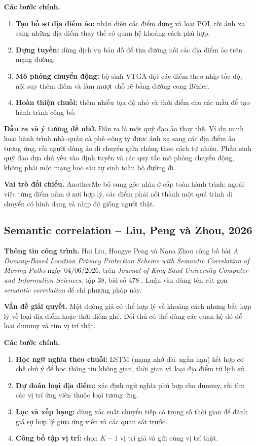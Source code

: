 \documentclass[12pt,a4paper,oneside]{report}
\begin{document}
\noindent\textbf{Các bước chính.}
\begin{enumerate}
  \item \textbf{Tạo hồ sơ địa điểm ảo:} nhận diện các điểm dừng và loại POI, rồi ánh xạ sang những địa điểm thay thế có quan hệ khoảng cách phù hợp.
  \item \textbf{Dựng tuyến:} dùng dịch vụ bản đồ để tìm đường nối các địa điểm ảo trên mạng đường.
  \item \textbf{Mô phỏng chuyển động:} bộ sinh VTGA đặt các điểm theo nhịp tốc độ, nội suy thêm điểm và làm mượt chỗ rẽ bằng đường cong Bézier.
  \item \textbf{Hoàn thiện chuỗi:} thêm nhiễu tọa độ nhỏ và thời điểm cho các mẫu để tạo hành trình công bố.
\end{enumerate}

\noindent\textbf{Đầu ra và ý tưởng dễ nhớ.}
Đầu ra là một quỹ đạo ảo thay thế. Ví dụ minh hoạ: hành trình nhà--quán cà phê--công ty được ánh xạ sang các địa điểm ảo tương ứng, rồi người dùng ảo di chuyển giữa chúng theo cách tự nhiên. Phần sinh quỹ đạo dựa chủ yếu vào định tuyến và các quy tắc mô phỏng chuyển động, không phải một mạng học sâu tự sinh toàn bộ đường đi.

\noindent\textbf{Vai trò đối chiếu.}
AnotherMe bổ sung góc nhìn ở cấp toàn hành trình: ngoài việc từng điểm nằm ở nơi hợp lý, các điểm phải nối thành một quá trình di chuyển có hình dạng và nhịp độ giống người thật.

\clearpage
\subsection{Semantic correlation -- Liu, Peng và Zhou, 2026}

\noindent\textbf{Thông tin công trình.}
Hai Liu, Hongye Peng và Nana Zhou công bố bài \emph{A Dummy-Based Location Privacy Protection Scheme with Semantic Correlation of Moving Paths} ngày 04/06/2026, trên \emph{Journal of King Saud University Computer and Information Sciences}, tập 38, bài số 478 \citep{liu2026semantic}. Luận văn dùng tên rút gọn \emph{semantic correlation} để chỉ phương pháp này.

\noindent\textbf{Vấn đề giải quyết.}
Một đường giả có thể hợp lý về khoảng cách nhưng bất hợp lý về loại địa điểm hoặc thời điểm ghé. Đối thủ có thể dùng các quan hệ đó để loại dummy và tìm vị trí thật.

\noindent\textbf{Các bước chính.}
\begin{enumerate}
  \item \textbf{Học ngữ nghĩa theo chuỗi:} LSTM (mạng nhớ dài--ngắn hạn) kết hợp cơ chế chú ý để học thông tin không gian, thời gian và loại địa điểm từ lịch sử.
  \item \textbf{Dự đoán loại địa điểm:} xác định ngữ nghĩa phù hợp cho dummy, rồi tìm các vị trí ứng viên thuộc loại tương ứng.
  \item \textbf{Lọc và xếp hạng:} dùng xác suất chuyển tiếp có trọng số thời gian để đánh giá sự hợp lý giữa ứng viên và các quan sát trước.
  \item \textbf{Công bố tập vị trí:} chọn $K-1$ vị trí giả và gửi cùng vị trí thật.
\end{enumerate}
\end{document}
